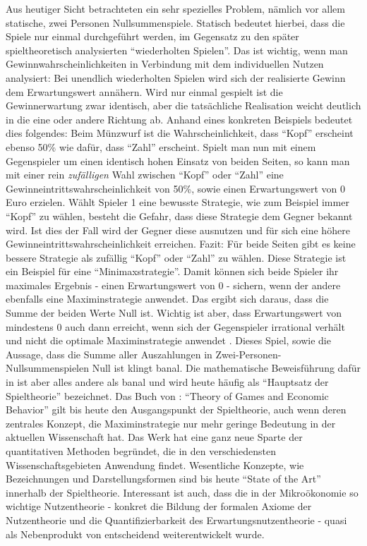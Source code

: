 Aus heutiger Sicht betrachteten \textcite{VonNeumann1944} ein sehr spezielles Problem, nämlich vor allem statische, zwei Personen Nullsummenspiele. Statisch bedeutet hierbei, dass die Spiele nur einmal durchgeführt werden, im Gegensatz zu den später spieltheoretisch analysierten "`wiederholten Spielen"'. Das ist wichtig, wenn man Gewinnwahrscheinlichkeiten in Verbindung mit dem individuellen Nutzen analysiert: Bei unendlich wiederholten Spielen wird sich der realisierte Gewinn dem Erwartungswert annähern. Wird nur einmal gespielt ist die Gewinnerwartung zwar identisch, aber die tatsächliche Realisation weicht deutlich in die eine oder andere Richtung ab.
Anhand eines konkreten Beispiels bedeutet dies folgendes: Beim Münzwurf ist die Wahrscheinlichkeit, dass "`Kopf"' erscheint ebenso 50\% wie dafür, dass "`Zahl"' erscheint. Spielt man nun mit einem Gegenspieler um einen identisch hohen Einsatz von beiden Seiten, so kann man mit einer rein \textit{zufälligen} Wahl zwischen "`Kopf"' oder "`Zahl"' eine Gewinneintrittswahrscheinlichkeit von 50\%, sowie einen Erwartungswert von 0 Euro erzielen. Wählt Spieler 1 eine bewusste Strategie, wie zum Beispiel immer "`Kopf"' zu wählen, besteht die Gefahr, dass diese Strategie dem Gegner bekannt wird. Ist dies der Fall wird der Gegner diese ausnutzen und für sich eine höhere Gewinneintrittswahrscheinlichkeit erreichen. Fazit: Für beide Seiten gibt es keine bessere Strategie als zufällig "`Kopf"' oder "`Zahl"' zu wählen. Diese Strategie ist ein Beispiel für eine "`Minimaxstrategie"'. Damit können sich beide Spieler ihr maximales Ergebnis - einen Erwartungswert von 0 -  sichern, wenn der andere ebenfalls eine Maximinstrategie anwendet. Das ergibt sich daraus, dass die Summe der beiden Werte Null ist. Wichtig ist aber, dass Erwartungswert von mindestens 0 auch dann erreicht, wenn sich der Gegenspieler irrational verhält und nicht die optimale Maximinstrategie anwendet \parencite{Selten2001}.  Dieses Spiel, sowie die Aussage, dass die Summe aller Auszahlungen in Zwei-Personen-Nullsummenspielen Null ist klingt banal. Die mathematische Beweisführung dafür in \textcite{VonNeumann1928} ist aber alles andere als banal und wird heute häufig als "`Hauptsatz der Spieltheorie"' bezeichnet. Das Buch von \textcite{VonNeumann1944}: "`Theory of Games and Economic Behavior"' gilt bis heute den Ausgangspunkt der Spieltheorie, auch wenn deren zentrales Konzept, die Maximinstrategie nur mehr geringe Bedeutung in der aktuellen Wissenschaft hat. Das Werk hat eine ganz neue Sparte der quantitativen Methoden begründet, die in den verschiedensten Wissenschaftsgebieten Anwendung findet. Wesentliche Konzepte, wie Bezeichnungen und Darstellungsformen sind bis heute "`State of the Art"' innerhalb der Spieltheorie. Interessant ist auch, dass die in der Mikroökonomie so wichtige Nutzentheorie - konkret die Bildung der formalen Axiome der Nutzentheorie und die Quantifizierbarkeit des Erwartungsnutzentheorie - quasi als Nebenprodukt von \textcite{VonNeumann1944} entscheidend weiterentwickelt wurde.


